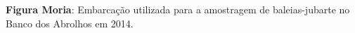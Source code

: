 
\textbf{Figura Moria}: Embarcação utilizada para a amostragem de baleias-jubarte no Banco dos Abrolhos em 2014. 